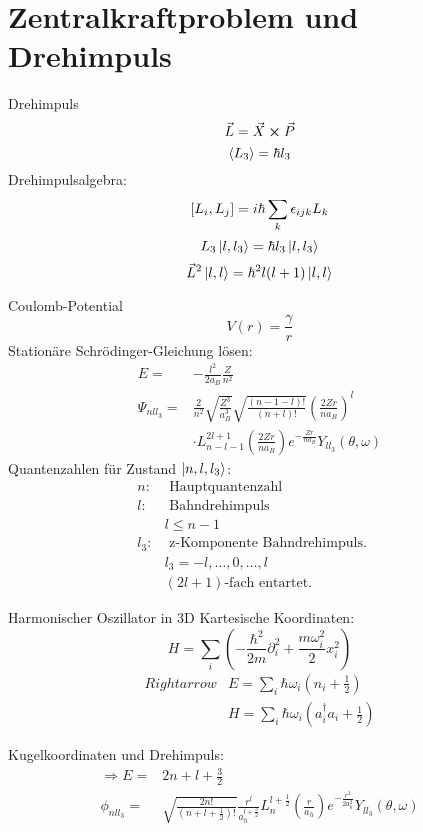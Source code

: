 \section{Zentralkraftproblem und Drehimpuls}

\begin{mainbox}{Drehimpuls}
\[ \vec{L} = \vec{X} \cross \vec{P} \]
\[\expval{L_3} = \hbar l_3\]
Drehimpulsalgebra:
\[\comm{L_i}{L_j} = i\hbar \sum_k \epsilon_{ijk} L_k \]
\[L_3 \ket{l, l_3} = \hbar l_3 \ket{l, l_3} \]
\[\vec{L}^2 \ket{l, l} = \hbar^2 l(l+1) \ket{l, l} \]
\end{mainbox}

\begin{mainbox}{Coulomb-Potential}
\[ V(r) = \frac{\gamma}{r} \]
Stationäre Schrödinger-Gleichung lösen:
\begin{align*}
    E =& -\frac{l^2}{2a_B} \frac{Z}{n^2} \\
    \Psi_{nll_3} =& \frac{2}{n^2}\sqrt{\frac{Z^3}{a_B^3}}\sqrt{\frac{(n-1-l)!}{(n+l)!}} \left(\frac{2Zr}{na_B}\right)^l \\ & \cdot L_{n-l-1}^{2l+1}\left(\frac{2Zr}{na_B}\right) e^{-\frac{Zr}{na_B}}Y_{ll_3}(\theta, \omega)
\end{align*}
Quantenzahlen für Zustand $\ket{n, l, l_3}$:
\begin{align*}
    n: &\text{ Hauptquantenzahl} &\\
    l: &\text{ Bahndrehimpuls} &\\
    & l \leq n-1 &\\
    l_3: &\text{ z-Komponente Bahndrehimpuls. } &\\
    & l_3 = {-l, \dots , 0, \dots , l} &\\
    &(2l+1)\text{-fach entartet.}
\end{align*}
\end{mainbox}

\begin{mainbox}{Harmonischer Oszillator in 3D}
Kartesische Koordinaten:
\[ H = \sum_i \left( -\frac{\hbar^2}{2m}\partial_i ^2 + \frac{m\omega_i^2}{2}x_i^2\right) \]
\begin{align*}
    Rightarrow & E = \sum_i \hbar \omega_i \left(n_i + \frac{1}{2}\right) \\
    & H = \sum_i \hbar \omega_i \left(a_i^\dag a_i + \frac{1}{2}\right)
\end{align*}

Kugelkoordinaten und Drehimpuls:
\begin{align*}
    \Rightarrow E =& 2n + l + \frac{3}{2} \\
     \phi_{nll_3} =& \sqrt{\frac{2n!}{(n+l+\frac{1}{2})!}} \frac{r^l}{a_h^{l+\frac{3}{2}}} L_n^{l+\frac{1}{2}} \left(\frac{r}{a_h}\right) e^{-\frac{r^2}{2a_h^2}} Y_{ll_3} (\theta, \omega)
\end{align*}
\end{mainbox}